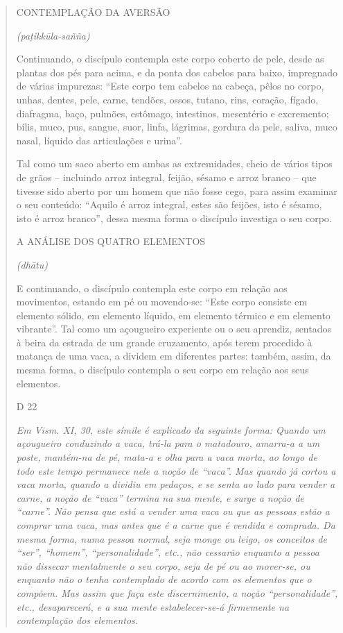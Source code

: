 \begin{quote}
CONTEMPLAÇÃO DA AVERSÃO

\emph{(paṭikkūla-sañña)}

Continuando, o discípulo contempla este corpo coberto de pele, desde as plantas dos pés para acima, e da ponta dos cabelos para baixo, impregnado de várias impurezas: ``Este corpo tem cabelos na cabeça, pêlos no corpo, unhas, dentes, pele, carne, tendões, ossos, tutano, rins, coração, fígado, diafragma, baço, pulmões, estômago, intestinos, mesentério e excremento; bílis, muco, pus, sangue, suor, linfa, lágrimas, gordura da pele, saliva, muco nasal, líquido das articulações e urina''.

Tal como um saco aberto em ambas as extremidades, cheio de vários tipos de grãos -- incluindo arroz integral, feijão, sésamo e arroz branco -- que tivesse sido aberto por um homem que não fosse cego, para assim examinar o seu conteúdo: ``Aquilo é arroz integral, estes são feijões, isto é sésamo, isto é arroz branco'', dessa mesma forma o discípulo investiga o seu corpo.

A ANÁLISE DOS QUATRO ELEMENTOS

\emph{(dhātu)}

E continuando, o discípulo contempla este corpo em relação aos movimentos, estando em pé ou movendo-se: ``Este corpo consiste em elemento sólido, em elemento líquido, em elemento térmico e em elemento vibrante''. Tal como um açougueiro experiente ou o seu aprendiz, sentados à beira da estrada de um grande cruzamento, após terem procedido à matança de uma vaca, a dividem em diferentes partes: também, assim, da mesma forma, o discípulo contempla o seu corpo em relação aos seus elementos.

D 22

\emph{Em Vism. XI, 30, este símile é explicado da seguinte forma: Quando um açougueiro conduzindo a vaca, trá-la para o matadouro, amarra-a a um poste, mantém-na de pé, mata-a e olha para a vaca morta, ao longo de todo este tempo permanece nele a noção de ``vaca''. Mas quando já cortou a vaca morta, quando a dividiu em pedaços, e se senta ao lado para vender a carne, a noção de ``vaca'' termina na sua mente, e surge a noção de ``carne''. Não pensa que está a vender uma vaca ou que as pessoas estão a comprar uma vaca, mas antes que é a carne que é vendida e comprada. Da mesma forma, numa pessoa normal, seja monge ou leigo, os conceitos de ``ser'', ``homem'', ``personalidade'', etc., não cessarão enquanto a pessoa não dissecar mentalmente o seu corpo, seja de pé ou ao mover-se, ou enquanto não o tenha contemplado de acordo com os elementos que o compõem. Mas assim que faça este discernimento, a noção ``personalidade'', etc., desaparecerá, e a sua mente estabelecer-se-á firmemente na contemplação dos elementos.}


\end{quote}
